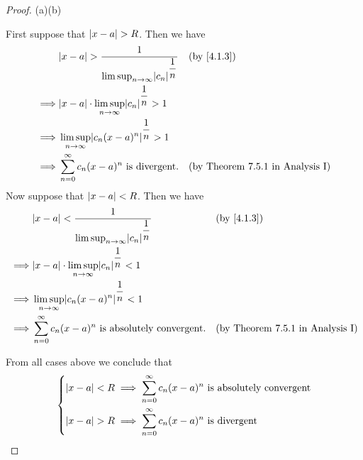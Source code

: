 \begin{proof}{(a)}{(b)}
\begin{itemize}
          First suppose that \(\left\lvert x - a\right\rvert > R\).
          Then we have
          \begin{align*}
                     & \abs{x - a} > \dfrac{1}{\limsup_{n \to \infty} \abs{c_n}^{\dfrac{1}{n}}} &  & \text{(by \cref{4.1.3})}                \\
            \implies & \abs{x - a} \cdot \limsup_{n \to \infty} \abs{c_n}^{\dfrac{1}{n}} > 1                                                 \\
            \implies & \limsup_{n \to \infty} \abs{c_n (x - a)^n}^{\dfrac{1}{n}} > 1                                                         \\
            \implies & \sum_{n = 0}^\infty c_n (x - a)^n \text{ is divergent}.                  &  & \text{(by Theorem 7.5.1 in Analysis I)}
          \end{align*}
          Now suppose that \(\left\lvert x - a\right\rvert < R\).
          Then we have
          \begin{align*}
                     & \abs{x - a} < \dfrac{1}{\limsup_{n \to \infty} \abs{c_n}^{\dfrac{1}{n}}} &  & \text{(by \cref{4.1.3})}                \\
            \implies & \abs{x - a} \cdot \limsup_{n \to \infty} \abs{c_n}^{\dfrac{1}{n}} < 1                                                 \\
            \implies & \limsup_{n \to \infty} \abs{c_n (x - a)^n}^{\dfrac{1}{n}} < 1                                                         \\
            \implies & \sum_{n = 0}^\infty c_n (x - a)^n \text{ is absolutely convergent}.      &  & \text{(by Theorem 7.5.1 in Analysis I)}
          \end{align*}
  \end{itemize}
  From all cases above we conclude that
  \[
    \begin{dcases}
      \left\lvert x - a\right\rvert < R \implies \sum_{n = 0}^\infty c_n (x - a)^n \text{ is absolutely convergent} \\
      \left\lvert x - a\right\rvert > R \implies \sum_{n = 0}^\infty c_n (x - a)^n \text{ is divergent}
    \end{dcases}
  \]
\end{proof}

